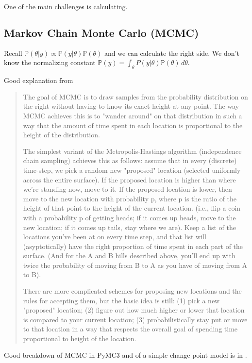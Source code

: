 \documentclass[12pt]{article}
\newcommand{\PP}{\ensuremath{\mathbb{P}}}
\begin{document}
One of the main challenges is calculating.

\subsection{Markov Chain Monte Carlo (MCMC)}


Recall $\PP(\theta|y) \propto \PP(y|\theta) \PP(\theta)$ and we can calculate the
right side. We don't know the normalizing constant $\PP(y) = \int_\theta P(y|\theta)
\PP(\theta) \, d\theta$.

Good explanation from \cite{12657}
\begin{quote}
  The goal of MCMC is to draw samples from the probability distribution on the
right without having to know its exact height at any point. The way MCMC achieves this is to
"wander around" on that distribution in such a way that the amount of time spent
in each location is proportional to the height of the distribution.

The simplest variant of the Metropolis-Hastings algorithm (independence chain sampling) achieves this as follows: assume that in every (discrete) time-step, we pick a random new "proposed" location (selected uniformly across the entire surface). If the proposed location is higher than where we're standing now, move to it. If the proposed location is lower, then move to the new location with probability p, where p is the ratio of the height of that point to the height of the current location. (i.e., flip a coin with a probability p of getting heads; if it comes up heads, move to the new location; if it comes up tails, stay where we are). Keep a list of the locations you've been at on every time step, and that list will (asyptotically) have the right proportion of time spent in each part of the surface. (And for the A and B hills described above, you'll end up with twice the probability of moving from B to A as you have of moving from A to B).

There are more complicated schemes for proposing new locations and the rules for
accepting them, but the basic idea is still: (1) pick a new "proposed" location;
(2) figure out how much higher or lower that location is compared to your
current location; (3) probabilistically stay put or move to that location in a
way that respects the overall goal of spending time proportional to height of
the location.
\end{quote}

Good breakdown of MCMC in PyMC3  and of a simple change point model is in \cite[Ch. 1]{pilon16_bayes}.
\end{document}
